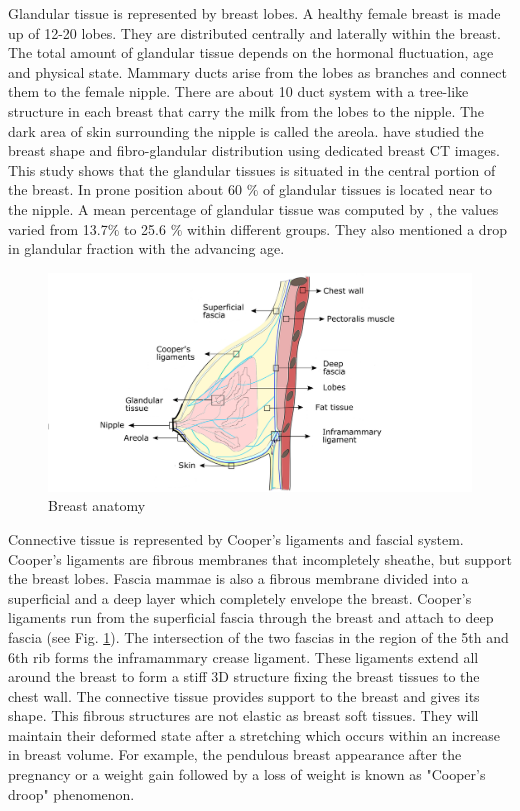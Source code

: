 Glandular tissue is represented by breast lobes. A healthy female breast is made up of 12-20 lobes. They are distributed centrally and laterally within the breast. The total amount of glandular tissue depends on the hormonal fluctuation, age and physical state.  Mammary ducts arise from the lobes as branches and connect them to the female nipple. There are about 10 duct system with a tree-like structure in each breast that carry the milk from the lobes to the nipple. The dark area of skin surrounding the nipple is called the areola. \cite{huang_shih-ying_characterization_2011} have studied the breast shape and fibro-glandular distribution using dedicated breast CT images. This study shows that the glandular tissues is situated in the central portion of the breast. In prone position about 60 $\%$ of glandular tissues is located near to the nipple. A mean percentage of glandular tissue was computed by \cite{yaffe_myth_2009}, the values varied from 13.7$\%$ to 25.6 $\%$ within different groups. They also mentioned a drop in glandular fraction with the advancing age. 


\begin{center}
\begin{figure}[h]
\includegraphics[width=\textwidth,height=\textheight,keepaspectratio]{figures/anatomieSeinEuBlack.png} 
\caption{Breast anatomy}
\label{breastanatomy}
\end{figure}
\end{center}

Connective tissue is represented by Cooper's ligaments and fascial system.  Cooper's ligaments are fibrous membranes that incompletely sheathe, but support the breast lobes. Fascia mammae is also a fibrous membrane divided into a superficial and a deep layer which completely envelope the breast. Cooper's ligaments run from the superficial fascia through the breast and attach to deep fascia (see Fig. \ref{breastanatomy}). The intersection of the two fascias in the region of the 5th and 6th rib forms the inframammary crease ligament. These ligaments extend all around the breast to form a stiff 3D structure fixing the breast tissues to the chest wall. The connective tissue provides support to the breast and gives its shape. This fibrous structures are not elastic as breast soft tissues. They will maintain their deformed state after a stretching which occurs within an increase in breast volume. For example, the pendulous breast appearance after the pregnancy or a weight gain followed by a loss of weight is known as "Cooper's droop" phenomenon.  \\

